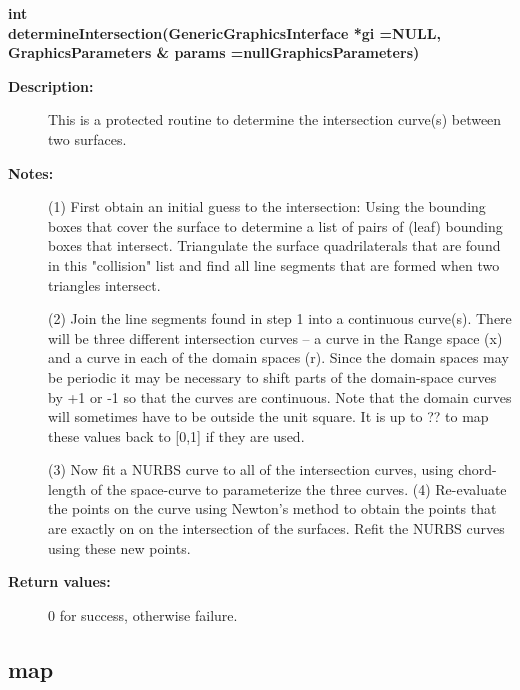 \begin{flushleft} \textbf{%
int  \\ 
\settowidth{\IntersectionMappingIncludeArgIndent}{determineIntersection(}%
determineIntersection(GenericGraphicsInterface *gi  =NULL,\\ 
\hspace{\IntersectionMappingIncludeArgIndent}GraphicsParameters \& params  =nullGraphicsParameters)
}\end{flushleft}
\begin{description}
\item[{\bf Description:}]  
   This is a protected routine to determine the intersection curve(s) between two surfaces.

\item[{\bf Notes:}] 

  (1) First obtain an initial guess to the intersection: Using the bounding boxes that cover
      the surface to determine a list of pairs of (leaf) bounding boxes that intersect. Triangulate
      the surface quadrilaterals that are found in this "collision" list and find all line segments
      that are formed when two triangles intersect.

  (2) Join the line segments found in step 1 into a continuous curve(s). There will be three 
    different intersection curves -- a curve in the Range space (x) and a curve in each of the
    domain spaces (r). Since the domain spaces may be periodic it may be necessary to shift 
    parts of the domain-space curves by +1 or -1 so that the curves are continuous. Note that
    the domain curves will sometimes have to be outside the unit square. It is up to ?? to map
    these values back to [0,1] if they are used.
    
  (3) Now fit a NURBS curve to all of the intersection curves, using chord-length of the space-curve
      to parameterize the three curves.
  (4) Re-evaluate the points on the curve using Newton's method to obtain the points that are exactly
      on on the intersection of the surfaces. Refit the NURBS curves using these new points. 

\item[{\bf Return values:}]  0 for success, otherwise failure.
\end{description}
\subsection{map}
 
